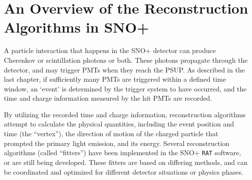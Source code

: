 
\section{An Overview of the Reconstruction Algorithms in SNO+}

A particle interaction that happens in the SNO+ detector can produce Cherenkov or scintillation photons or both. These photons propagate through the detector, and may trigger PMTs when they reach the PSUP. As described in the last chapter, if sufficiently many PMTs are triggered within a defined time window, an `event' is determined by the trigger system to have occurred, and the time and charge information measured by the hit PMTs are recorded.

By utilizing the recorded time and charge information, reconstruction algorithms attempt to calculate the physical quantities, including the event position and time (the ``vertex''), the direction of motion of the charged particle that prompted the primary light emission, and its energy. Several reconstruction algorithms (called ``fitters'') have been implemented in the SNO+ \texttt{RAT} software, or are still being developed. These fitters are based on differing methods, and can be coordinated and optimized for different detector situations or physics phases.

